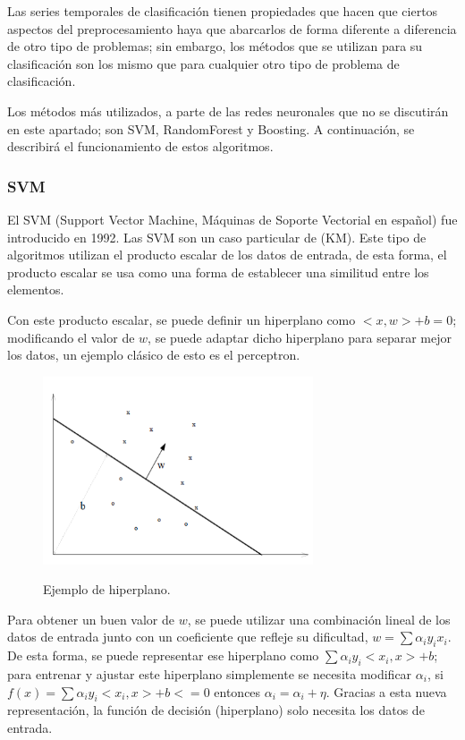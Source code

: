 Las series temporales de clasificación tienen propiedades que hacen que ciertos aspectos del preprocesamiento haya que abarcarlos de forma diferente a diferencia de otro tipo de problemas; sin embargo, los métodos que se utilizan para su clasificación son los mismo que para cualquier otro tipo de problema de clasificación.\newline

Los métodos más utilizados, a parte de las redes neuronales que no se discutirán en este apartado; son SVM, RandomForest y Boosting. A continuación, se describirá el funcionamiento de estos algoritmos.\newline

\subsubsection{SVM}
El SVM (Support Vector Machine, Máquinas de Soporte Vectorial en español) fue introducido en 1992. Las SVM son un caso particular de  (KM). Este tipo de algoritmos utilizan el producto escalar de los datos de entrada, de esta forma, el producto escalar se usa como una forma de establecer una similitud entre los elementos.\newline

Con este producto escalar, se puede definir un hiperplano como $<x,w> + b = 0$; modificando el valor de $w$, se puede adaptar dicho hiperplano para separar mejor los datos, un ejemplo clásico de esto es el perceptron.\newline

\begin{figure}[h]
	\centering
	\includegraphics[width=80mm]{imagenes/perceptron_example.png}
	\label{fig:214}
	\caption{Ejemplo de hiperplano.}
\end{figure}
\newpage

Para obtener un buen valor de $w$, se puede utilizar una combinación lineal de los datos de entrada junto con un coeficiente que refleje su dificultad, $ w = \sum \alpha_i y_i x_i $. De esta forma, se puede representar ese hiperplano como $\sum \alpha_i y_i <x_i,x> + b$; para entrenar y ajustar este hiperplano simplemente se necesita modificar $\alpha_i$, si $f(x) = \sum \alpha_i y_i <x_i,x> + b <= 0$ entonces $\alpha_i = \alpha_i + \eta$. Gracias a esta nueva representación, la función de decisión (hiperplano) solo necesita los datos de entrada.\newline

